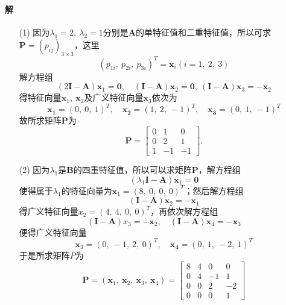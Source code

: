 \documentclass[12pt, a4paper, oneside, fontset=none]{ctexart}
\begin{document}
\paragraph*{解}
\begin{enumerate}
    \item[(1)]
        因为$\lambda_1 = 2,\ \lambda_2 = 1$分别是$\bm{A}$的单特征值和二重特征值，所以可求$\bm{P} = (p_{ij})_{3\times 3}$，这里
        \[
            (p_{1i},\ p_{2i},\ p_{3i})^T = \bm{x}_i(i = 1,\ 2,\ 3)
        \]
        解方程组
        \[
            (2\bm{I} - \bm{A})\bm{x}_1 = \bm{0}, \quad (\bm{I} - \bm{A})\bm{x}_2 = \bm{0},\ (\bm{I} - \bm{A})\bm{x}_3 = -\bm{x}_2
        \]
        得特征向量$\bm{x}_1,\ \bm{x}_2$及广义特征向量$\bm{x}_3$依次为
        \[
            \bm{x_1} = (0,\ 0,\ 1)^T,\quad \bm{x_2} = (1,\ 2,\ -1)^T,\quad \bm{x_3} = (0,\ 1,\ -1)^T
        \]
        故所求矩阵$\bm{P}$为
        \[
            \bm{P} = \begin{bmatrix}
                0 & 1  & 0  \\
                0 & 2  & 1  \\
                1 & -1 & -1
            \end{bmatrix}.
        \]
    \item[(2)]
        因为$\lambda_1$是$\bm{B}$的四重特征值，所以可以求矩阵$\bm{P}$，解方程组
        \[
            (\lambda_1\bm{I} - \bm{A})\bm{x}_1 = \bm{0}
        \]
        使得属于$\lambda_1$的特征向量为$\bm{x}_1 = (8,\ 0,\ 0,\ 0)^T$；然后解方程组
        \[
            (\bm{I} - \bm{A})\bm{x}_2 = -\bm{x}_1
        \]
        得广义特征向量$x_2 = (4,\ 4,\ 0,\ 0)^T$，再依次解方程组
        \[
            (\bm{I} - \bm{A})x_3 = -\bm{x}_2, \quad (\bm{I} - \bm{A})\bm{x}_4 = -\bm{x}_3
        \]
        便得广义特征向量
        \[
            \bm{x}_3 = (0,\ -1,\ 2,\ 0)^T, \quad \bm{x_4} = (0,\ 1,\ -2,\ 1)^T
        \]
        于是所求矩阵$P$为
        \[
            \bm{P} = (\bm{x}_1,\ \bm{x}_2,\ \bm{x}_3,\ \bm{x}_4) = \begin{bmatrix}
                8 & 4 & 0  & 0  \\
                0 & 4 & -1 & 1  \\
                0 & 0 & 2  & -2 \\
                0 & 0 & 0  & 1
            \end{bmatrix}
        \]
\end{enumerate}

\par \ \par
\end{document}
